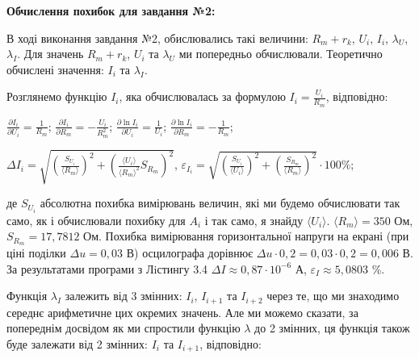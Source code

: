 \documentclass[12pt,a4paper]{article}
\begin{document}
    \textbf{\large Обчислення похибок для завдання №2:}

    \setlength{\parindent}{1.5em}

    \vspace{1em}

    В ході виконання завдання №2, обислювались такі величини: $R_m + r_k$, $U_i$, $I_i$, $\lambda_U$, $\lambda_I$. Для значень
    $R_m + r_k$, $U_i$ та $\lambda_U$ ми попередньо обчислювали. Теоретично обчислені значення: $I_i$ та $\lambda_I$.

    Розглянемо функцію $I_i$, яка обчислювалась за формулою $\displaystyle I_i = \frac{U_i}{R_m}$, відповідно:

    \begin{center}

        $\displaystyle \frac{\partial I_i}{\partial U_i} = \frac{1}{R_m}$; $\displaystyle \frac{\partial I_i}{\partial R_m} = -\frac{U_i}{R_m^2}$;
        $\displaystyle \frac{\partial \ln I_i}{\partial U_i} = \frac{1}{U_i}$; $\displaystyle \frac{\partial \ln I_i}{\partial R_m} = -\frac{1}{R_m}$;

    \end{center}

    \begin{center}

        $\displaystyle \Delta I_i = \sqrt{\left( \frac{S_{U_i}}{\text{⟨}R_m\text{⟩}} \right)^2 + \left( \frac{\text{⟨}U_i\text{⟩}}{\text{⟨}R_m\text{⟩}^2} S_{R_m} \right)^2}$, 
        $\displaystyle \varepsilon_{I_i} = \sqrt{\left( \frac{S_{U_i}}{\text{⟨}U_i\text{⟩}} \right)^2 + \left( \frac{S_{R_m}}{\text{⟨}R_m\text{⟩}} \right)^2} \cdot 100 \%$;
    
    \end{center}

    де $S_{U_i}$ абсолютна похибка вимірювань величин, які ми будемо обчислювати так само, як і обчислювали похибку для $A_i$ і так само, я знайду $\text{⟨}U_i\text{⟩}$. $\text{⟨}R_m\text{⟩} = 350$ Ом, $S_{R_m} = 17,7812$ Ом.
    Похибка вимірювання горизонтальної напруги на екрані (при ціні поділки $\Delta u = 0,03$ В) осцилографа дорівнює $\Delta u \cdot 0,2 = 0,03 \cdot 0,2 = 0,006$ В.
    За результатами програми з Лiстингу 3.4 $\Delta I \approx 0,87 \cdot 10^{-6}$ А, $\varepsilon_I \approx 5,0803$ \%.

    Функція $\lambda_I$ залежить від 3 змінних: $I_i$, $I_{i+1}$ та $I_{i+2}$ через те, що ми знаходимо середнє арифметичне цих окремих значень.
    Але ми можемо сказати, за попереднім досвідом як ми спростили функцію $\lambda$ до 2 змінних, ця функція також буде залежати від 2 змінних: $I_i$ та $I_{i+1}$, відповідно:
\end{document}
